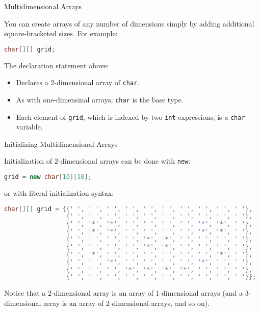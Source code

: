 \documentclass[xcolor={table}]{beamer}
\author[Chris Simpkins] 
{Christopher Simpkins \\\texttt{chris.simpkins@gatech.edu}}
\institute[Georgia Tech] %
\date[CS 1331]{}
\title[\course] %
{\lesson}
\subtitle{}
\begin{document}
\begin{frame}
  \titlepage
\end{frame}


\begin{frame}[fragile]{Multidimensional Arrays}


You can create arrays of any number of dimensions simply by adding additional square-bracketed sizes.  For example:

\begin{lstlisting}[language=Java]
char[][] grid;
\end{lstlisting}
The declaration statement above:
\begin{itemize}
\item Declares a 2-dimensional array of  {\tt char}.
\item As with one-dimensinal arrays, {\tt char} is the base type.
\item Each element of {\tt grid}, which is indexed by two {\tt int} expressions, is a {\tt char} variable.
\end{itemize}


\end{frame}

\begin{frame}[fragile]{Initializing Multidimensional Arrays}


Initialization of 2-dimensional arrays can be done with {\tt new}:
\begin{lstlisting}[language=Java]
grid = new char[10][10];
\end{lstlisting}

or with literal initialization syntax:
\begin{lstlisting}[language=Java]
char[][] grid = {{' ', ' ', ' ', ' ', ' ', ' ', ' ', ' ', ' ', ' '},
                 {' ', ' ', ' ', ' ', ' ', ' ', ' ', ' ', ' ', ' '},
                 {' ', '*', '*', ' ', ' ', ' ', ' ', '*', '*', ' '},
                 {' ', '*', '*', ' ', ' ', ' ', ' ', '*', '*', ' '},
                 {' ', ' ', ' ', ' ', '*', '*', ' ', ' ', ' ', ' '},
                 {' ', ' ', ' ', ' ', '*', '*', ' ', ' ', ' ', ' '},
                 {' ', '*', ' ', ' ', ' ', ' ', ' ', ' ', '*', ' '},
                 {' ', ' ', '*', ' ', ' ', ' ', ' ', '*', ' ', ' '},
                 {' ', ' ', ' ', '*', '*', '*', '*', ' ', ' ', ' '},
                 {' ', ' ', ' ', ' ', ' ', ' ', ' ', ' ', ' ', ' '}};
\end{lstlisting}

Notice that a 2-dimensional array is an array of 1-dimensional arrays (and a 3-dimensional array is an array of 2-dimensional arrays, and so on).

\end{frame}
\end{document}
